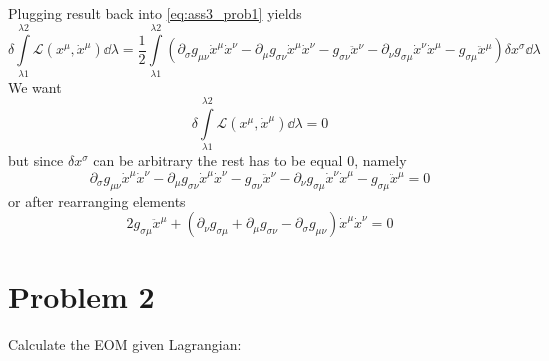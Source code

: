 %
Plugging result back into \autoref{eq:ass3_prob1} yields
%
\begin{equation}
    \delta\int\limits_{\lambda1}^{\lambda2}\mathcal{L}(x^\mu,\dot{x}^\mu)\dd\lambda =
    \frac{1}{2}\int\limits_{\lambda1}^{\lambda2}
    \left(\partial_\sigma g_{\mu\nu}\dot{x}^\mu\dot{x}^\nu -
    \partial_{\mu}g_{\sigma\nu}\dot{x}^\mu\dot{x}^\nu - g_{\sigma\nu}\ddot{x}^\nu -
    \partial_{\nu}g_{\sigma\mu}\dot{x}^\nu\dot{x}^\mu - g_{\sigma\mu}\ddot{x}^\mu\right)\delta x^\sigma \dd\lambda
\end{equation}
%
We want
%
\begin{equation}
   \delta\int\limits_{\lambda1}^{\lambda2}\mathcal{L}(x^\mu,\dot{x}^\mu)\dd\lambda = 0
\end{equation}
%
but since $\delta x^\sigma$ can be arbitrary the rest has to be equal $0$, namely
%
\begin{equation}
    \partial_\sigma g_{\mu\nu}\dot{x}^\mu\dot{x}^\nu -
    \partial_{\mu}g_{\sigma\nu}\dot{x}^\mu\dot{x}^\nu - g_{\sigma\nu}\ddot{x}^\nu -
    \partial_{\nu}g_{\sigma\mu}\dot{x}^\nu\dot{x}^\mu - g_{\sigma\mu}\ddot{x}^\mu = 0
\end{equation}
%
or after rearranging elements
%
\begin{equation}
    \boxed{2 g_{\sigma\mu}\ddot{x}^\mu + \left(\partial_{\nu}g_{\sigma\mu} +
        \partial_{\mu}g_{\sigma\nu} - \partial_\sigma g_{\mu\nu}\right)\dot{x}^\mu\dot{x}^\nu = 0}
\end{equation}

\section*{Problem 2}

Calculate the EOM given Lagrangian:

